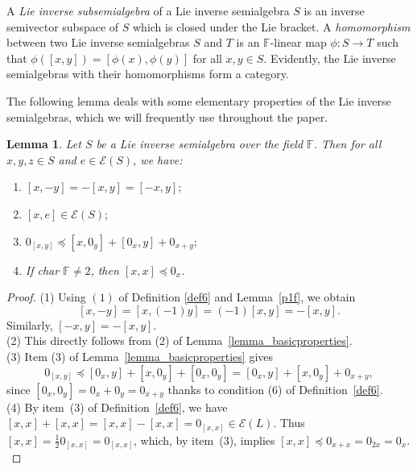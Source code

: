 \documentclass[10pt,a4paper]{amsart}
\newtheorem{lem}[thm]{Lemma}
\theoremstyle{definition}
\theoremstyle{remark}
\numberwithin{equation}{section}
\newtheorem*{Theorem A}{\textbf{Theorem A}}
\newtheorem*{Corollary E}{\textbf{Corollary E}}
\newtheorem*{Corollary F}{\textbf{Corollary F}}
\newtheorem*{Theorem B}{\textbf{Theorem B}}
\newtheorem*{Theorem C}{\textbf{Theorem C}}
\newtheorem*{Theorem D}{\textbf{Theorem B}}
\newtheorem*{p a}{\textbf{Proof of  Theorem A}}
\newtheorem*{p b}{\textbf{Proof of Theorem B}}
\newtheorem*{p c}{\textbf{Proof of  Theorem C}}
\newtheorem*{p d}{\textbf{Proof of  Theorem D}}
\newcommand{\E}{\mathcal{E}}
\newcommand{\F}{\mathbb{F}}
\newcommand{\0}{{\vartheta}}
\begin{document}
 
 A {\em Lie inverse subsemialgebra} of a Lie inverse semialgebra $S$ is an inverse semivector subspace of $S$ which is closed under the Lie bracket. A  {\em homomorphism} between two Lie inverse semialgebras $S$ and $T$ is an $\F$-linear map $\phi: S\to T$ such that $\phi([x,y])=[\phi(x),\phi(y)]$ for all $x,y\in S$. Evidently, the Lie inverse semialgebras with their homomorphisms form a category. 

The following lemma deals with some elementary properties of the Lie inverse semialgebras, which we will frequently use throughout the paper.

\begin{lem}\label{lemma-basicprop}
 Let $S$ be a Lie inverse semialgebra over the field $\mathbb{F}$. Then  for all $x,y,z\in S$ and $e \in \E(S)$, we have:
\begin{enumerate}
    \item $[x,-y]=- [x,y]=[-x,y];$
    \item $[x,e]\in \E(S);$ 
    \item $0_{[x,y]}\preceq [x,0_y]+[0_x,y]+0_{x+y};$
    \item If {\rm char} $\F \neq 2$, then $[x,x]\preceq 0_x$.
\end{enumerate}
\end{lem}
\begin{proof}

(1)  Using  $(1)$ of Definition \ref{def6}   and Lemma~\ref{p1f}, we obtain
  $$  [x,-y]= [x,(-1)y]=(-1)[x,y]=-[x,y].$$  
Similarly, $[-x,y]=-[x,y].$\\


\noindent (2) This directly follows from (2) of  Lemma~\ref{lemma_basicproperties}.\\


\noindent (3)  Item (3) of  Lemma~\ref{lemma_basicproperties} gives
$$0_{[x,y]} \preceq  [0_x,y]+[x,0_y]+  [0_x, 0_y] =  [0_x,y]+[x,0_y] + 0_{x+y},$$ since  $ [0_x, 0_y] =  0_x + 0_y =    0_{x+y}$ thanks to condition (6) of
 Definition~\ref{def6}.\\





\noindent (4) By item~(3) of Definition~\ref{def6}, we have $[x,x]+[x,x]=[x,x]-[x,x]=0_{[x,x]}\in \E(L)$. Thus $[x,x]=\frac{1}{2}0_{[x,x]}=0_{[x,x]}$, which,   by item~(3), implies  $[x,x]\preceq 0_{x+x} = 0_{2x} = 0_x.$
\end{proof}
\end{document}
